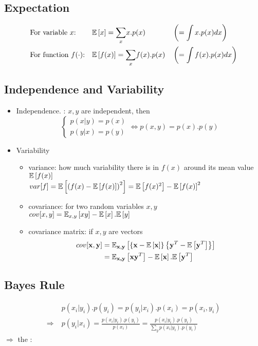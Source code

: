 \subsection{Expectation}
\label{subsec:expectation}
\begin{align*}
	& \text{For variable $x$:} && \mathbb{E} \left[ x \right] = \underset{x}{\sum}x.p(x) && \left( = \int x.p(x)dx \right)\\
	& \text{For function $f(\cdot)$:} && \mathbb{E} \left[ f(x) \right] = \underset{x}{\sum}f(x).p(x) && \left( = \int f(x).p(x)dx \right)
\end{align*}

\subsection{Independence and Variability}
\begin{itemize}
	\item Independence. \Eg: $x, y$ are independent, then
	\[\begin{cases}
		p(x|y) = p(x)\\
		p(y|x) = p(y)
	\end{cases}
	\Leftrightarrow p(x,y) = p(x).p(y)\]	
	\item Variability
	\begin{itemize}
		\item variance: how much variability there is in $f(x)$ around its mean value $\mathbb{E} \left[ f(x) \right]$\\
		$var [f] = \mathbb{E} \left[ \left(f(x)-\mathbb{E} \left[ f(x) \right]\right)^2 \right] = \mathbb{E} \left[ f(x)^2 \right] - \mathbb{E} \left[ f(x) \right]^2$
		\item covariance: for two random variables $x, y$\\
		$cov [x, y] = \mathbb{E}_{x,y}\left[xy\right] - \mathbb{E} \left[ x \right].\mathbb{E} \left[ y \right]$
		\item covariance matrix: if $x, y$ are vectors
		\begin{align*}
			cov [\textbf{x}, \textbf{y}] &= \mathbb{E}_{\textbf{x},\textbf{y}} \left[ \left\{\textbf{x}-\mathbb{E} \left[ \textbf{x} \right]\right\} \left\{\textbf{y}^T -  \mathbb{E} \left[ \textbf{y}^T \right] \right\} \right]\\
			&= \mathbb{E}_{\textbf{x,y}}\left[\textbf{xy}^T\right] - \mathbb{E} \left[ \textbf{x} \right].\mathbb{E} \left[ \textbf{y}^T \right]
		\end{align*}
	\end{itemize}
\end{itemize}

\subsection{Bayes Rule}
\label{subsec:bayes-rule}
\begin{align*}
	& p(x_i|y_i).p(y_i) = p(y_i|x_i).p(x_i) = p(x_i, y_i) \\
	\Rightarrow\; &p(y_i|x_i) = \frac{p(x_i|y_i).p(y_i)}{p(x_i)} = \frac{p(x_i|y_i).p(y_i)}{\underset{y}{\sum} p(x_i|y_i).p(y_i)}
\end{align*}
$\Rightarrow$ the :

